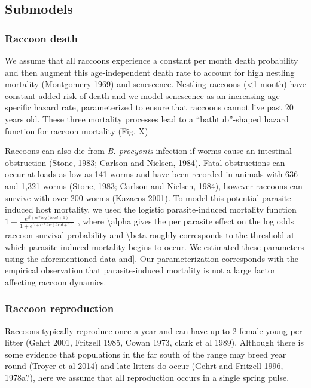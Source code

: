 \documentclass[11pt]{article}
\begin{document}
\subsection{Submodels}

\subsubsection{Raccoon death}

We assume that all raccoons experience a constant per month death
probability and then augment this age-independent death rate to account
for high nestling mortality (Montgomery 1969) and senescence. Nestling
raccoons (\textless{}1 month) have constant added risk of death and we
model senescence as an increasing age-specific hazard rate,
parameterized to ensure that raccoons cannot live past 20 years old.
These three mortality processes lead to a ``bathtub''-shaped hazard
function for raccoon mortality (Fig. X)

Raccoons can also die from \emph{B. procyonis} infection if worms cause
an intestinal obstruction (Stone, 1983; Carlson and Nielsen, 1984).
Fatal obstructions can occur at loads as low as 141 worms and have been
recorded in animals with 636 and 1,321 worms (Stone, 1983; Carlson and
Nielsen, 1984), however raccoons can survive with over 200 worms
(Kazacos 2001). To model this potential parasite-induced host mortality,
we used the logistic parasite-induced mortality function
\(1 - \frac{e^{\beta + \alpha*log(load + 1)}}{1 + e^{\beta + \alpha*log(load + 1)}}\)
, where \textbackslash{}alpha gives the per parasite effect on the log
odds raccoon survival probability and \textbackslash{}beta roughly
corresponds to the threshold at which parasite-induced mortality begins
to occur. We estimated these parameters using the aforementioned data
and{]}. Our parameterization corresponds with the empirical observation
that parasite-induced mortality is not a large factor affecting raccoon
dynamics.

\subsubsection{Raccoon reproduction}

Raccoons typically reproduce once a year and can have up to 2 female
young per litter (Gehrt 2001, Fritzell 1985, Cowan 1973, clark et al
1989). Although there is some evidence that populations in the far south
of the range may breed year round (Troyer et al 2014) and late litters
do occur (Gehrt and Fritzell 1996, 1978a?), here we assume that all
reproduction occurs in a single spring pulse.
\end{document}
